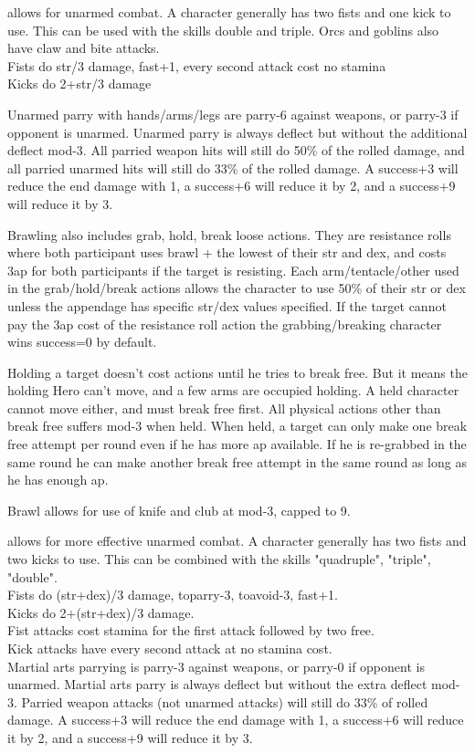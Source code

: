  allows for unarmed combat. A character generally has two fists and one kick to use. This can be used with the skills double and triple. Orcs and goblins also have claw and bite attacks.\\
Fists do str/3 damage, fast+1, every second attack cost no stamina \\
Kicks do 2+str/3 damage

Unarmed parry with hands/arms/legs are parry-6 against weapons, or parry-3 if opponent is unarmed. Unarmed parry is always deflect but without the additional deflect mod-3. All parried weapon hits will still do 50\% of the rolled damage, and all parried unarmed hits will still do 33\% of the rolled damage. A success+3 will reduce the end damage with 1, a success+6 will reduce it by 2, and a success+9 will reduce it by 3.

Brawling also includes grab, hold, break loose actions. They are resistance rolls where both participant uses brawl + the lowest of their str and dex, and costs 3ap for both participants if the target is resisting.     %
Each arm/tentacle/other used in the grab/hold/break actions allows the character to use 50\% of their str or dex unless the appendage has specific str/dex values specified.
If the target cannot pay the 3ap cost of the resistance roll action the grabbing/breaking character wins success=0 by default.

Holding a target doesn't cost actions until he tries to break free. But it means the holding Hero can't move, and a few arms are occupied holding. A held character cannot move either, and must break free first. All physical actions other than break free suffers mod-3 when held.
When held, a target can only make one break free attempt per round even if he has more ap available. If he is re-grabbed in the same round he can make another break free attempt in the same round as long as he has enough ap.

Brawl allows for use of knife and club at mod-3, capped to 9.


 allows for more effective unarmed combat. A character generally has two fists and two kicks to use. This can be combined with the skills "quadruple", "triple", "double". \\
Fists do (str+dex)/3 damage, toparry-3, toavoid-3, fast+1. \\
Kicks do 2+(str+dex)/3 damage.\\
Fist attacks cost stamina for the first attack followed by two free.\\
Kick attacks have every second attack at no stamina cost. \\
Martial arts parrying is parry-3 against weapons, or parry-0 if opponent is unarmed. Martial arts parry is always deflect but without the extra deflect mod-3. Parried weapon attacks (not unarmed attacks) will still do 33\% of rolled damage. A success+3 will reduce the end damage with 1, a success+6 will reduce it by 2, and a success+9 will reduce it by 3.

